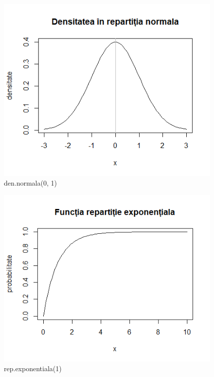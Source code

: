 \documentclass[12pt]{article}
\begin{document}
\begin{figure}[h!]
	\centering		
	\includegraphics[scale=0.75]{DenNorm}
	\caption{den.normala(0, 1)}
\end{figure}

\begin{figure}
	\centering
	\includegraphics[scale=0.75]{RepExp}
	\caption{rep.exponentiala(1)}	
\end{figure}
\end{document}
